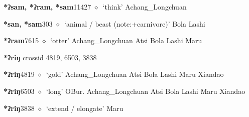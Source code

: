   \begin{list}{}{\leftmargin=1.5em \itemindent=-1.5em}
  \item {\footnotesize \textbf{*ʔsam, *ʔram, *sam}}{\tiny 11427}
         $\diamond$~`think'
         Achang\_Longchuan 
  \item {\footnotesize \textbf{*san, *sam}}{\tiny 303}
\hspace{1ex}
         $\diamond$~`animal / beast (note:+carnivore)'
         Bola 
\hspace{1ex}
         Lashi 
  \item {\footnotesize \textbf{*ʔram}}{\tiny 7615}
\hspace{1ex}
         $\diamond$~`otter'
         Achang\_Longchuan 
\hspace{1ex}
         Atsi 
\hspace{1ex}
         Bola 
\hspace{1ex}
         Lashi 
\hspace{1ex}
         Maru 
  \end{list}
\item
\textbf{*ʔriŋ}
  {\tiny crossid 4819, 6503, 3838}
  \begin{list}{}{\leftmargin=1.5em \itemindent=-1.5em}
  \item {\footnotesize \textbf{*ʔriŋ}}{\tiny 4819}
         $\diamond$~`gold'
         Achang\_Longchuan 
\hspace{1ex}
         Atsi 
\hspace{1ex}
         Bola 
\hspace{1ex}
         Lashi 
\hspace{1ex}
         Maru 
\hspace{1ex}
         Xiandao 
  \item {\footnotesize \textbf{*ʔriŋ}}{\tiny 6503}
\hspace{1ex}
         $\diamond$~`long'
         OBur. 
\hspace{1ex}
         Achang\_Longchuan 
\hspace{1ex}
         Atsi 
\hspace{1ex}
         Bola 
\hspace{1ex}
         Lashi 
\hspace{1ex}
         Maru 
\hspace{1ex}
         Xiandao 
  \item {\footnotesize \textbf{*ʔriŋ}}{\tiny 3838}
\hspace{1ex}
         $\diamond$~`extend / elongate'
         Maru 
  \end{list}
